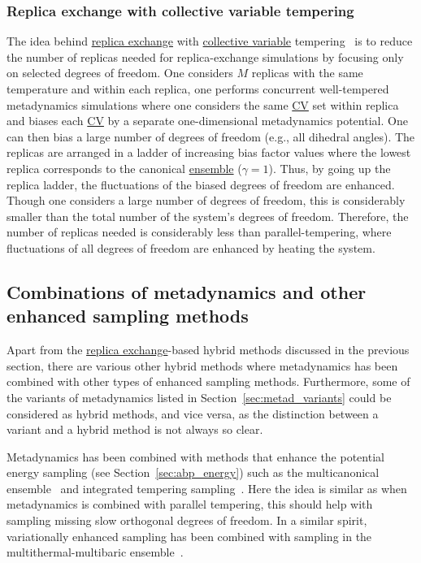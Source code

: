 \documentclass[9pt,review]{livecoms}
\begin{document}
\subsubsection{Replica exchange with collective variable tempering}

The idea behind \hyperlink{ref:ReplEx} {replica exchange} with \hyperlink{ref:CV} {collective variable} tempering~\cite{Gil-Ley_JCTC-2015} is to reduce the number of replicas needed for replica-exchange simulations by focusing only on selected degrees of freedom. One considers $M$ replicas with the same temperature and within each replica, one performs concurrent well-tempered metadynamics simulations where one considers the same \hyperlink{ref:CV} {CV} set within replica and biases each \hyperlink{ref:CV} {CV} by a separate one-dimensional metadynamics potential. One can then bias a large number of degrees of freedom (e.g., all dihedral angles). The replicas are arranged in a ladder of increasing bias factor values where the lowest replica corresponds to the canonical \hyperlink{ref:Ensemble} {ensemble} ($\gamma=1$). Thus, by going up the replica ladder, the fluctuations of the biased degrees of freedom are enhanced. Though one considers a large number of degrees of freedom, this is considerably smaller than the total number of the system's degrees of freedom. Therefore, the number of replicas needed is considerably less than parallel-tempering, where fluctuations of all degrees of freedom are enhanced by heating the system.

\subsection{Combinations of metadynamics and other enhanced sampling methods}

Apart from the \hyperlink{ref:ReplEx} {replica exchange}-based hybrid methods discussed in the previous section, there are various other hybrid methods where metadynamics has been combined with other types of enhanced sampling methods. Furthermore, some of the variants of metadynamics listed in Section~\ref{sec:metad_variants} could be considered as hybrid methods, and vice versa, as the distinction between a variant and a hybrid method is not always so clear.

Metadynamics has been combined with methods that enhance the potential energy sampling (see Section~\ref{sec:abp_energy}) such as the multicanonical ensemble~\cite{Yonezawa_MulticanonicalMetaD_2011} and integrated tempering sampling~\cite{Yang_MetaD-ITS_1_2016,Yang_MetaD-ITS_2_2018}. Here the idea is similar as when metadynamics is combined with parallel tempering, this should help with sampling missing slow orthogonal degrees of freedom. In a similar spirit, variationally enhanced sampling has been combined with sampling in the multithermal-multibaric ensemble~\cite{Piaggi_MultiVES_2019,Piaggi_MultiVES+CV_2019}.
\end{document}

